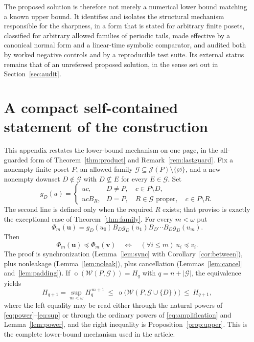 \documentclass[11pt,a4paper]{article}
\numberwithin{equation}{section}
\theoremstyle{definition}
\theoremstyle{remark}
\newcommand{\mot}{\mathop{o}}
\newcommand{\W}{\mathcal W}
\newcommand{\J}{\mathcal J}
\newcommand{\G}{\mathcal G}
\newcommand{\emb}{\preccurlyeq}
\newcommand{\Hn}[1]{H_{#1}}
\begin{document}
The proposed solution is therefore not merely a numerical lower bound matching
a known upper bound. It identifies and isolates the structural mechanism
responsible for the sharpness, in a form that is stated for arbitrary finite
posets, classified for arbitrary allowed families of periodic tails, made
effective by a canonical normal form and a linear-time symbolic comparator,
and audited both by worked negative controls and by a reproducible test suite.
Its external status remains that of an unrefereed proposed solution, in the
sense set out in Section~\ref{sec:audit}.

\appendix
\clearpage
\section{A compact self-contained statement of the construction}
\label{app:quickref}

This appendix restates the lower-bound mechanism on one page, in the
all-guarded form of Theorem~\ref{thm:product} and
Remark~\ref{rem:lastguard}. Fix a nonempty finite poset $P$, an allowed family
$\G\subseteq\J(P)\setminus\{\varnothing\}$, and a new nonempty downset
$D\notin\G$ with $D\nsubseteq E$ for every $E\in\G$. Set
\[
 g_D(u)=
 \begin{cases}
  uc,&D\ne P,\quad c\in P\setminus D,\\
  ucB_R,&D=P,\quad R\in\G\text{ proper},\quad c\in P\setminus R.
 \end{cases}
\]
The second line is defined only when the required $R$ exists; that proviso is
exactly the exceptional case of Theorem~\ref{thm:family}. For every
$m<\omega$ put
\[
 \Phi_m(\mathbf u)=g_D(u_0)B_Dg_D(u_1)B_D\cdots B_Dg_D(u_m).
\]
Then
\[
 \boxed{\quad
 \Phi_m(\mathbf u)\emb\Phi_m(\mathbf v)
 \quad\Longleftrightarrow\quad
 (\forall i\le m)\ u_i\emb v_i.
 \quad}
\]
The proof is synchronization (Lemma~\ref{lem:sync} with
Corollary~\ref{cor:between}), plus nonleakage (Lemma~\ref{lem:noleak}), plus
cancellation (Lemmas~\ref{lem:cancel} and~\ref{lem:padding}). If
$\mot(\W(P,\G))=\Hn q$ with $q=n+|\G|$, the equivalence yields
\[
 \Hn{q+1}=\sup_{m<\omega}\Hn q^{\,m+1}
 \ \le\ \mot\bigl(\W(P,\G\cup\{D\})\bigr)\ \le\ \Hn{q+1},
\]
where the left equality may be read either through the natural powers of
\eqref{eq:power}--\eqref{eq:sup} or through the ordinary powers of
\eqref{eq:amplification} and Lemma~\ref{lem:power}, and the right inequality
is Proposition~\ref{prop:upper}. This is the complete lower-bound mechanism
used in the article.
\end{document}
